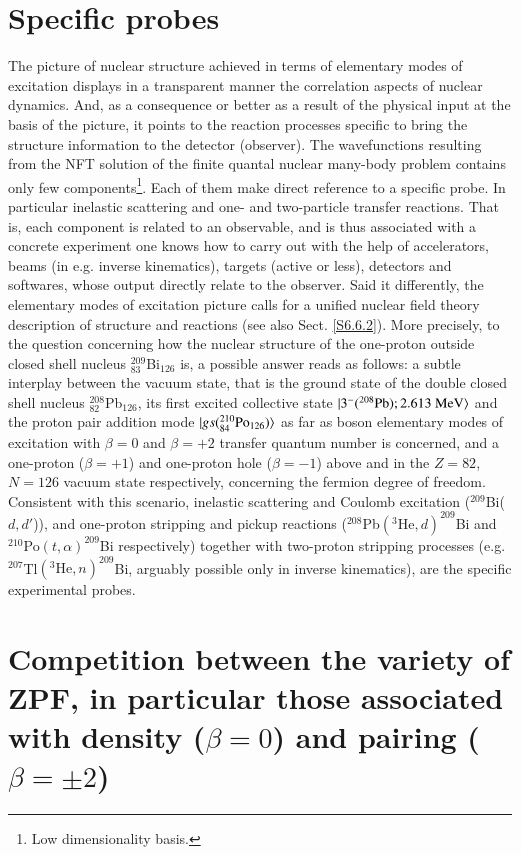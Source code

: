 \section{Specific probes}
The picture of nuclear structure achieved in terms of elementary modes of excitation displays in a transparent manner the correlation aspects of nuclear dynamics. And, as a consequence or better as a result of the physical input at the basis of the picture, it points to the reaction processes specific to bring the structure information to the detector (observer). The wavefunctions resulting from the NFT solution of the finite quantal nuclear many-body problem contains only few components\footnote{Low dimensionality basis.}. Each of them make direct reference to a specific probe. In particular inelastic scattering and one- and two-particle transfer reactions. That is, each component is related to an observable, and is thus associated with a concrete experiment one knows how to carry out with the help of accelerators, beams (in e.g. inverse kinematics), targets (active or less), detectors and softwares, whose output directly relate to the observer. Said it differently, the elementary modes of excitation picture calls for a unified nuclear field theory description of structure and reactions (see also Sect. \ref{S6.6.2}). More precisely, to the question concerning how the nuclear structure of the one-proton outside closed shell nucleus $^{209}_{83}$Bi$_{126}$ is, a possible answer reads as follows: a subtle interplay between the vacuum state, that is the ground state of the double closed shell nucleus $^{208}_{82}$Pb$_{126}$, its first excited collective state $|{3^-(^{208}\text{Pb});2.613\text{ MeV}} \rangle$ and the proton pair addition mode $|{gs(^{210}_{84}\text{Po}_{126})} \rangle$ as far as boson elementary modes of excitation with $\beta=0$ and $\beta=+2$ transfer quantum number is concerned, and a one-proton ($\beta=+1$) and one-proton hole ($\beta=-1$) above and in the $Z=82$, $N=126$ vacuum state respectively, concerning the fermion degree of freedom. Consistent with this scenario, inelastic scattering and Coulomb excitation ($^{209}$Bi($d,d'$)),  and one-proton stripping and pickup reactions ($^{208}$Pb$(^3\text{He},d)^{209}$Bi and $^{210}$Po$(t,\alpha)^{209}$Bi respectively) together with two-proton stripping processes (e.g. $^{207}$Tl$(^3\text{He},n)^{209}$Bi, arguably possible only in inverse kinematics), are the specific experimental probes.
\section[Competition between ZPF]{Competition between the variety of ZPF, in particular those associated with density ($\beta=0$) and pairing ($\beta=\pm2$)}\label{appintroF}

